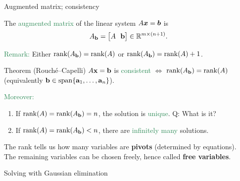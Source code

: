 \documentclass{beamer}
\DeclareMathOperator{\rank}{rank}
\begin{document}
\begin{frame}{Augmented matrix; consistency}
 
The \textcolor{SeaGreen}{augmented matrix} of the linear system $A\boldsymbol x=\boldsymbol b$ is 
\[
A_{\bf b}=\big[A\ \ {\bf b}\big]\in\mathbb R^{m\times(n+1)}.
\]

\medskip
\textcolor{SeaGreen}{Remark:} Either $\rank(A_{\bf b})=\rank(A)$ or $\rank(A_{\bf b})=\rank(A)+1$.

\begin{alertblock}{Theorem (Rouché--Capelli)}
$A{\bf x}={\bf b}$ is \textcolor{SeaGreen}{consistent}  
\quad $\Longleftrightarrow$\quad  
$\rank(A_{\bf b})=\rank(A)$ \quad 
{\tiny (equivalently ${\bf b}\in\mathrm{span}\{{\bf a}_1,\ldots,{\bf a}_n\}$).}
\end{alertblock}

\textcolor{SeaGreen}{Moreover:}
\begin{enumerate}
\item If $\rank(A)=\rank(A_{\bf b})=n$, the solution is \textcolor{SeaGreen}{unique}. \alert{Q:} What is it?
\item If $\rank(A)=\rank(A_{\bf b})<n$, there are \textcolor{SeaGreen}{infinitely many} solutions.  
\end{enumerate}
\medskip
The rank tells us how many variables are \textbf{pivots} (determined by equations).  \\[3mm]
The remaining variables can be chosen freely, hence called \textbf{free variables}.
\end{frame}


\begin{frame}
\begin{center}
	\alert{\Huge Solving with Gaussian elimination}
\end{center}
\end{frame}
\end{document}
